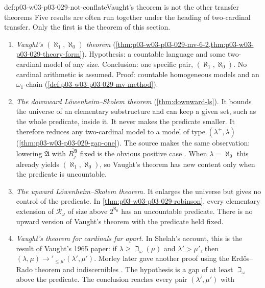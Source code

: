 \begin{hbwarning}{def:p03-w03-p03-029-not-conflate}{Vaught's theorem is not the other transfer theorems}
Five results are often run together under the heading of two-cardinal
transfer. Only the first is the theorem of this section.
\begin{enumerate}
  \item \emph{Vaught's \((\aleph_1,\aleph_0)\) theorem}
        (\cref{thm:p03-w03-p03-029-mv-6-2,thm:p03-w03-p03-029-theory-form}).
        Hypothesis: a countable language and some two-cardinal model of any
        size. Conclusion: one specific pair, \((\aleph_1,\aleph_0)\). No
        cardinal arithmetic is assumed. Proof: countable homogeneous models
        and an \(\omega_1\)-chain (\cref{def:p03-w03-p03-029-mv-method}).
  \item \emph{The downward L\"owenheim--Skolem theorem}
        (\cref{thm:downward-ls}). It bounds the universe of an elementary
        substructure and can keep a given set, such as the whole predicate,
        inside it. It never makes the predicate smaller. It therefore
        reduces any two-cardinal model to a model of type
        \((\lambda^+,\lambda)\)
        (\cref{thm:p03-w03-p03-029-gap-one}). The source makes the same
        observation: lowering \(\overline{\mathfrak A}\) with
        \(\overline{R_j^{\mathfrak A}}\) fixed is the obvious positive case
        \cite[p.~56]{MorleyVaught1962}. When \(\lambda=\aleph_0\) this
        already yields \((\aleph_1,\aleph_0)\), so Vaught's theorem has new
        content only when the predicate is uncountable.
  \item \emph{The upward L\"owenheim--Skolem theorem.} It enlarges the
        universe but gives no control of the predicate. In
        \cref{thm:p03-w03-p03-029-robinson}, every elementary extension of
        \(\mathcal R_\omega\) of size above \(2^{\aleph_0}\) has an
        uncountable predicate. There is no upward version of Vaught's
        theorem with the predicate held fixed.
  \item \emph{Vaught's theorem for cardinals far apart.} In Shelah's
        account, this is the result of Vaught's 1965 paper: if
        \(\lambda\geq\beth_\omega(\mu)\) and \(\lambda'>\mu'\), then
        \((\lambda,\mu)\to'_{\leq\mu'}(\lambda',\mu')\). Morley later gave
        another proof using the Erd\H{o}s--Rado theorem and indiscernibles
        \cite[p.~4, item~(G)]{Shelah2004PairAlephN}. The hypothesis is a
        gap of at least \(\beth_\omega\) above the predicate. The
        conclusion reaches every pair \((\lambda',\mu')\) with

\end{enumerate}
\end{hbwarning}

